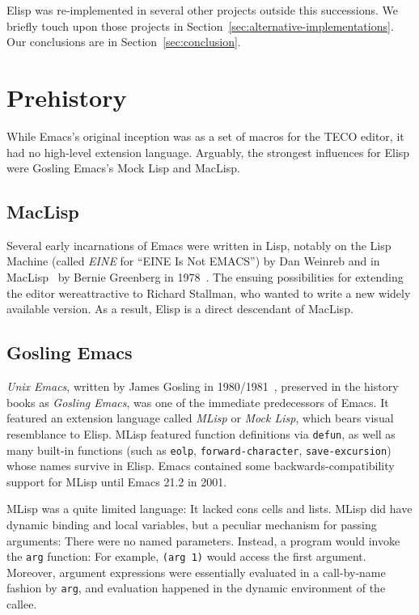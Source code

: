 \documentclass[format=acmsmall, review=false, screen=true]{acmart}
\newcommand \Elisp {Elisp}
\begin{document}
\Elisp{} was re-implemented in several other projects outside this
successions.  We briefly touch upon those projects in
Section~\ref{sec:alternative-implementations}.  Our conclusions are in
Section~\ref{sec:conclusion}.

\section{Prehistory}
\label{sec:prehistory}

While Emacs's original inception was as a set of macros for the TECO
editor, it had no high-level extension language.  Arguably, the
strongest influences for \Elisp{} were Gosling Emacs's Mock Lisp and
MacLisp.

\subsection{MacLisp}

Several early incarnations of Emacs were written in Lisp, notably on
the Lisp Machine (called \emph{EINE} for ``EINE Is Not EMACS'') by
Dan Weinreb and in MacLisp~\cite{Moon1974,Pitman1983} by Bernie Greenberg in
1978~\cite{Stallman2002}.  The ensuing possibilities for extending the
editor wereattractive to Richard Stallman, who wanted to write a new
widely available version.  As a result, \Elisp{} is a direct
descendant of MacLisp.


\subsection{Gosling Emacs}

\emph{Unix Emacs}, written by James Gosling in
1980/1981~\cite{Gosling1981}, preserved in the history books
as \emph{Gosling Emacs}, was one of the immediate predecessors of
Emacs.  It featured an extension language called \emph{MLisp} or
\emph{Mock Lisp}, which bears visual resemblance to \Elisp{}.
MLisp featured function definitions via \texttt{defun}, as well as
many built-in functions (such as \texttt{eolp},
\texttt{forward-character}, \texttt{save-excursion}) whose names
survive in \Elisp{}.  Emacs contained some backwards-compatibility
support for MLisp until Emacs 21.2 in 2001.

MLisp was a quite limited language: It lacked cons cells and lists.
MLisp did have dynamic binding and local variables, but a peculiar
mechanism for passing arguments:  There were no named
parameters.  Instead, a program would invoke the \texttt{arg}
function: For example, \texttt{(arg 1)} would access the first
argument.  Moreover, argument expressions were essentially evaluated
in a call-by-name fashion by \texttt{arg}, and evaluation happened in
the dynamic environment of the callee.
\end{document}
